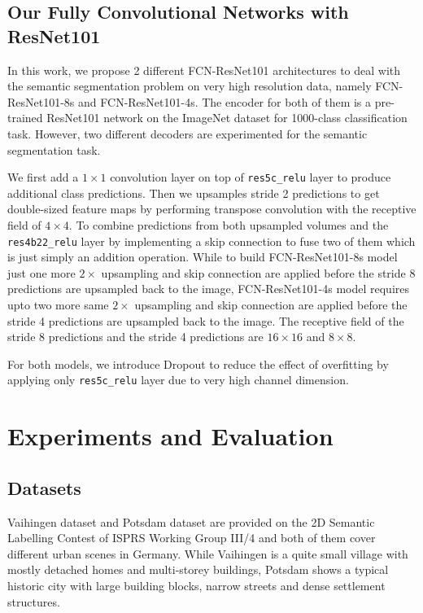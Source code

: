 \documentclass[conference]{IEEEtran}
\begin{document}
\subsection{Our Fully Convolutional Networks with ResNet101}
In this work, we propose 2 different FCN-ResNet101 architectures to deal with
the semantic segmentation problem on very high resolution data, namely
FCN-ResNet101-8s and FCN-ResNet101-4s. The encoder for both of them is a
pre-trained ResNet101 network on the ImageNet dataset for 1000-class
classification task. However, two different decoders are experimented for the
semantic segmentation task.

We first add a $1 \times 1$ convolution layer on top of \texttt{res5c\_relu}
layer to produce additional class predictions. Then we upsamples stride 2
predictions to get double-sized feature maps by performing transpose convolution
with the receptive field of $4 \times 4$. To combine predictions from both
upsampled volumes and the \texttt{res4b22\_relu} layer by implementing a skip
connection to fuse two of them which is just simply an addition operation. While
to build FCN-ResNet101-8s model just one more $2 \times$ upsampling and skip
connection are applied before the stride 8 predictions are upsampled back to the
image, FCN-ResNet101-4s model requires upto two more same $2 \times$ upsampling
and skip connection are applied before the stride 4 predictions are upsampled
back to the image. The receptive field of the stride 8 predictions and the
stride 4 predictions are $16 \times 16$ and $8 \times 8$.

For both models, we introduce Dropout to reduce the effect of overfitting by
applying only \texttt{res5c\_relu} layer due to very high channel dimension.

\section{Experiments and Evaluation}
\subsection{Datasets}
Vaihingen dataset and Potsdam dataset are provided on the 2D Semantic Labelling
Contest of ISPRS Working Group III/4 and both of them cover different urban
scenes in Germany. While Vaihingen is a quite small village with mostly detached
homes and multi-storey buildings, Potsdam shows a typical historic city with
large building blocks, narrow streets and dense settlement structures.
\end{document}
